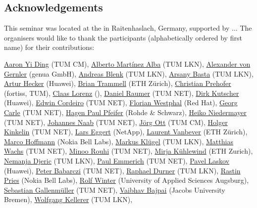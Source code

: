 \subsection*{Acknowledgements}\label{sec:acknowledgement}

This seminar was located at the in Raitenhaslach, Germany, supported by ...
The organisers would like to thank the participants (alphabetically ordered by
first name) for their contributions:

\href{}{Aaron Yi Ding} (TUM CM),
\href{}{Alberto Martínez Alba} (TUM LKN),
\href{}{Alexander von Gernler} (genua GmbH),
\href{}{Andreas Blenk} (TUM LKN),
\href{}{Arsany Basta} (TUM LKN),
\href{}{Artur Hecker} (Huawei),
\href{}{Brian Trammell} (ETH Zürich),
\href{}{Christian Prehofer} (fortiss, TUM),
\href{}{Claas Lorenz} (),
\href{}{Daniel Raumer} (TUM NET),
\href{}{Dirk Kutscher} (Huawei),
\href{}{Edwin Cordeiro} (TUM NET),
\href{}{Florian Westphal} (Red Hat),
\href{}{Georg Carle} (TUM NET),
\href{}{Hagen Paul Pfeifer} (Rohde \& Schwarz),
\href{}{Heiko Niedermayer} (TUM NET),
\href{}{Johannes Naab} (TUM NET),
\href{}{Jörg Ott} (TUM CM),
\href{}{Holger Kinkelin} (TUM NET),
\href{}{Lars Eggert} (NetApp),
\href{}{Laurent Vanbever} (ETH Zürich),
\href{}{Marco Hoffmann} (Nokia Bell Labs),
\href{}{Markus Klügel} (TUM LKN),
\href{}{Matthias Wachs} (TUM NET),
\href{}{Minoo Rouhi} (TUM NET),
\href{}{Mirja Kühlewind} (ETH Zurich),
\href{}{Nemanja Djeric} (TUM LKN),
\href{}{Paul Emmerich} (TUM NET),
\href{}{Pavel Laskov} (Huawei),
\href{}{Peter Babarczi} (TUM NET),
\href{}{Raphael Durner} (TUM LKN),
\href{}{Rastin Pries} (Nokia Bell Labs),
\href{}{Rolf Winter} (University of Applied Sciences Augsburg),
\href{}{Sebastian Gallenmüller} (TUM NET),
\href{}{Vaibhav Bajpai} (Jacobs University Bremen),
\href{}{Wolfgang Kellerer} (TUM LKN),

\vfill\eject

